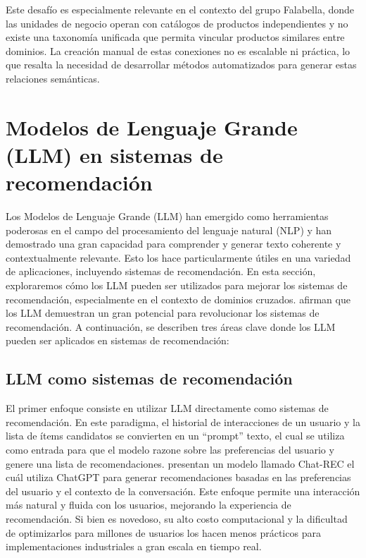 		Este desafío es especialmente relevante en el contexto del grupo Falabella, donde las unidades de negocio operan con catálogos de productos independientes y no existe una taxonomía unificada que permita vincular productos similares entre dominios. La creación manual de estas conexiones no es escalable ni práctica, lo que resalta la necesidad de desarrollar métodos automatizados para generar estas relaciones semánticas.

\section{Modelos de Lenguaje Grande (LLM) en sistemas de recomendación}
	Los Modelos de Lenguaje Grande (LLM) han emergido como herramientas poderosas en el campo del procesamiento del lenguaje natural (NLP) y han demostrado una gran capacidad para comprender y generar texto coherente y contextualmente relevante. Esto los hace particularmente útiles en una variedad de aplicaciones, incluyendo sistemas de recomendación. En esta sección, exploraremos cómo los LLM pueden ser utilizados para mejorar los sistemas de recomendación, especialmente en el contexto de dominios cruzados. \cite{10506571} afirman que los LLM demuestran un gran potencial para revolucionar los sistemas de recomendación. A continuación, se describen tres áreas clave donde los LLM pueden ser aplicados en sistemas de recomendación:

	\subsection{LLM como sistemas de recomendación}
		El primer enfoque consiste en utilizar LLM directamente como sistemas de recomendación. En este paradigma, el historial de interacciones de un usuario y la lista de ítems candidatos se convierten en un \enquote{prompt} texto, el cual se utiliza como entrada para que el modelo razone sobre las preferencias del usuario y genere una lista de recomendaciones. \cite{DBLP:journals/corr/abs-2303-14524} presentan un modelo llamado Chat-REC el cuál utiliza ChatGPT para generar recomendaciones basadas en las preferencias del usuario y el contexto de la conversación. Este enfoque permite una interacción más natural y fluida con los usuarios, mejorando la experiencia de recomendación. Si bien es novedoso, su alto costo computacional y la dificultad de optimizarlos para millones de usuarios los hacen menos prácticos para implementaciones industriales a gran escala en tiempo real.

